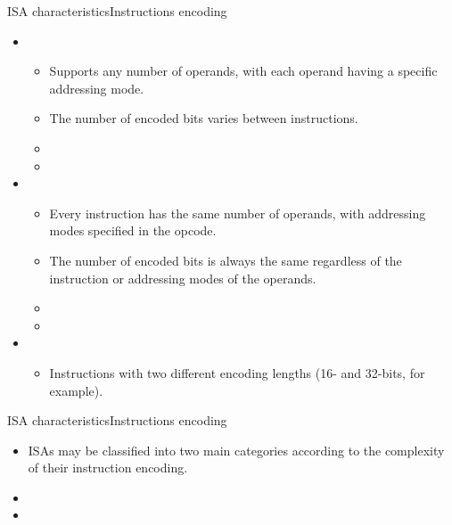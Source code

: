 \documentclass[]{slides}
\begin{document}
\begin{frame}{\acs{ISA} characteristics}{Instructions encoding}
\begin{itemize}
  \item {} 
 \begin{itemize}
    \item Supports any number of operands, with each operand having a specific addressing mode.
    \item The number of encoded bits varies between instructions.
    \item {}
    \item {}
  \end{itemize}
  \item {} 
  \begin{itemize}
    \item Every instruction has the same number of operands, with addressing modes specified in the opcode.
    \item The number of encoded bits is always the same regardless of the instruction or addressing modes of the operands.
    \item {}
    \item {}
  \end{itemize}
  \item {}
  \begin{itemize}
  \item Instructions with two different encoding lengths (16- and 32-bits, for example).
  \end{itemize}
\end{itemize}   
\end{frame}

\begin{frame}{\acs{ISA} characteristics}{Instructions encoding}
  \begin{itemize}
    \item \acp{ISA} may be classified into two main categories according to the complexity of their instruction encoding.
    \item {}
    \item {}
  \end{itemize}     
\end{frame}
\end{document}
